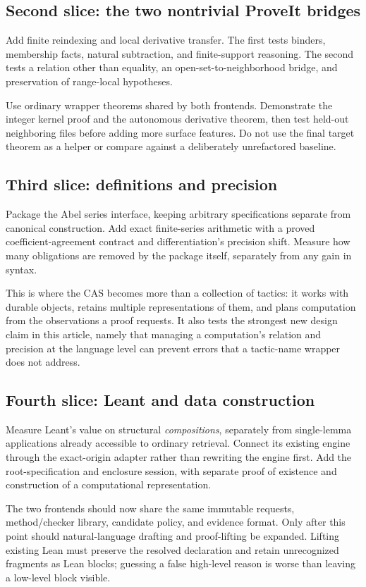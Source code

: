 \documentclass[11pt,a4paper]{article}
\theoremstyle{remark}\newtheorem{example}[proposition]{Example}
\begin{document}
\subsection{Second slice: the two nontrivial ProveIt bridges}
Add finite reindexing and local derivative transfer. The first tests binders, membership facts, natural subtraction, and finite-support reasoning. The second tests a relation other than equality, an open-set-to-neighborhood bridge, and preservation of range-local hypotheses.

Use ordinary wrapper theorems shared by both frontends. Demonstrate the integer kernel proof and the autonomous derivative theorem, then test held-out neighboring files before adding more surface features. Do not use the final target theorem as a helper or compare against a deliberately unrefactored baseline.

\subsection{Third slice: definitions and precision}
Package the Abel series interface, keeping arbitrary specifications separate from canonical construction. Add exact finite-series arithmetic with a proved coefficient-agreement contract and differentiation's precision shift. Measure how many obligations are removed by the package itself, separately from any gain in syntax.

This is where the CAS becomes more than a collection of tactics: it works with durable objects, retains multiple representations of them, and plans computation from the observations a proof requests. It also tests the strongest new design claim in this article, namely that managing a computation's relation and precision at the language level can prevent errors that a tactic-name wrapper does not address.

\subsection{Fourth slice: Leant and data construction}
Measure Leant's value on structural \emph{compositions}, separately from single-lemma applications already accessible to ordinary retrieval. Connect its existing engine through the exact-origin adapter rather than rewriting the engine first. Add the root-specification and enclosure session, with separate proof of existence and construction of a computational representation.

The two frontends should now share the same immutable requests, method/checker library, candidate policy, and evidence format. Only after this point should natural-language drafting and proof-lifting be expanded. Lifting existing Lean must preserve the resolved declaration and retain unrecognized fragments as Lean blocks; guessing a false high-level reason is worse than leaving a low-level block visible.
\end{document}
